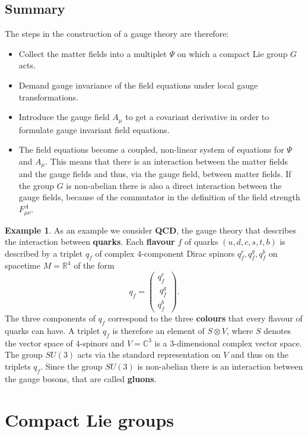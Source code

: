 \documentclass[12pt]{amsart}
\theoremstyle{definition}
\newtheorem{ex}[thm]{Example}
\theoremstyle{remark}
\numberwithin{equation}{section}
\begin{document}
\subsection{Summary}
The steps in the construction of a gauge theory are therefore:
\begin{itemize}
\item Collect the matter fields into a multiplet $\Psi$ on which a compact Lie group $G$ acts.
\item Demand gauge invariance of the field equations under local gauge transformations.
\item Introduce the gauge field $A_\mu$ to get a covariant derivative in order to formulate gauge invariant field equations.
\item The field equations become a coupled, non-linear system of equations for $\Psi$ and $A_\mu$. This means that there is an interaction between the matter fields and the gauge fields and thus, via the gauge field, between matter fields. If the group $G$ is non-abelian there is also a direct interaction between the gauge fields, because of the commutator in the definition of the field strength $F^A_{\mu\nu}$.
\end{itemize}
\begin{ex}
As an example we consider {\bf QCD}, the gauge theory that describes the interaction between {\bf quarks}. Each {\bf flavour} $f$ of quarks $(u, d, c, s, t, b)$ is described by a triplet $q_f$ of complex 4-component Dirac spinors $q_f^r,q_f^g,q_f^b$ on spacetime $M=\mathbb{R}^4$ of the form 
\begin{equation*}
q_f=\left(\begin{array}{c} q_f^r \\ \ q_f^g \\ q_f^b\end{array}\right).
\end{equation*}
The three components of $q_f$ correspond to the three {\bf colours} that every flavour of quarks can have. A triplet $q_f$ is therefore an element of $S\otimes V$, where $S$ denotes the vector space of 4-spinors and $V=\mathbb{C}^3$ is a 3-dimensional complex vector space. The group $SU(3)$ acts via the standard representation on $V$ and thus on the triplets $q_f$. Since the group $SU(3)$ is non-abelian there is an interaction between the gauge bosons, that are called {\bf gluons}.
\end{ex}





\section{Compact Lie groups}\label{sect compact lie groups}
\end{document}
